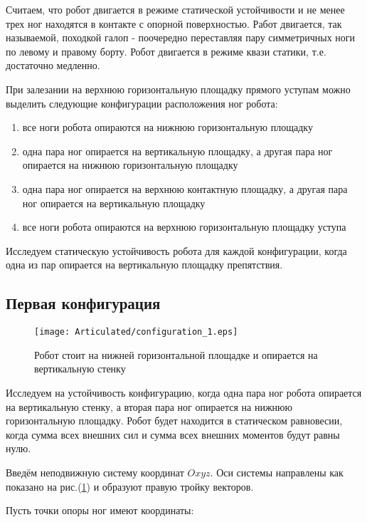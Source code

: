 Считаем, что робот двигается в режиме статической устойчивости и не менее трех ног находятся в контакте с опорной поверхностью. Работ двигается, так называемой, походкой галоп - поочередно переставляя пару симметричных ноги по левому и правому борту. Робот двигается в режиме квази статики, т.е. достаточно медленно.

При залезании на верхнюю горизонтальную площадку прямого уступам можно выделить следующие конфигурации расположения ног робота:

\begin{enumerate}
  \item все ноги робота опираются на нижнюю горизонтальную площадку
  \item одна пара ног опирается на вертикальную площадку, а другая пара ног опирается на нижнюю горизонтальную площадку
  \item одна пара ног опирается на верхнюю контактную площадку, а другая пара ног опирается на вертикальную площадку
  \item все ноги робота опираются на верхнюю горизонтальную площадку уступа
\end{enumerate}

Исследуем статическую устойчивость робота для каждой конфигурации, когда одна из пар опирается на вертикальную площадку препятствия. 


\subsection{Первая конфигурация}
\label{articulated:case1}

\begin{figure}[ht]
  \centering
  \texttt{[image: Articulated/configuration\_1.eps]}
  \caption{Робот стоит на нижней горизонтальной площадке и опирается на вертикальную стенку}
  \label{articulated:configuration_1}
\end{figure}


Исследуем на устойчивость конфигурацию, когда одна пара ног робота опирается на вертикальную стенку, а вторая пара ног опирается на нижнюю горизонтальную площадку. Робот будет находится в статическом равновесии, когда сумма всех внешних сил и сумма всех внешних моментов будут равны нулю.

Введём неподвижную систему координат $Oxyz$. Оси системы направлены как показано на рис.(\ref{articulated:configuration_1}) и образуют правую тройку векторов.

Пусть точки опоры ног имеют координаты:

